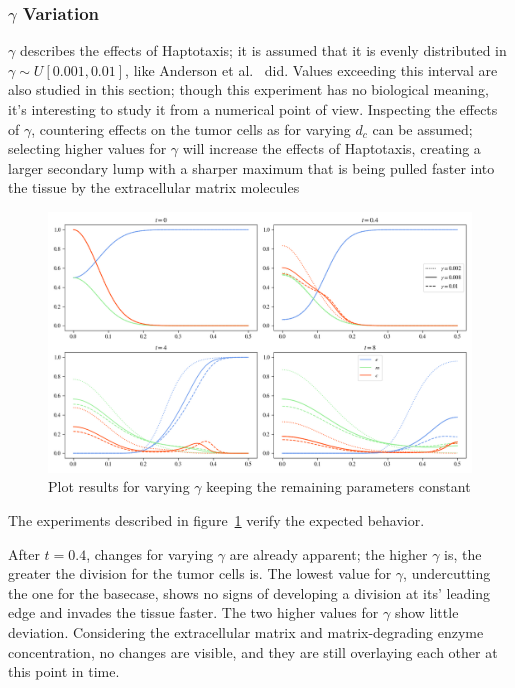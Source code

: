 \subsubsection*{$\gamma$ Variation}
$\gamma$ describes the effects of Haptotaxis; it is assumed that it is evenly distributed in $\gamma \sim U[0.001,0.01]$, like Anderson et al.~\cite{anderson_mathematical_2000} did. Values exceeding this interval are also studied in this section; though this experiment has no biological meaning, it's interesting to study it from a numerical point of view. Inspecting the effects of $\gamma$, countering effects on the tumor cells as for varying $d_c$ can be assumed; selecting higher values for $\gamma$ will increase the effects of Haptotaxis, creating a larger secondary lump with a sharper maximum that is being pulled faster into the tissue by the extracellular matrix molecules
\begin{figure}[h!]
 \centering
 \includegraphics[width=\textwidth]{resources/images/gamma_variation.png}
 \caption{Plot results for varying $\gamma$ keeping the remaining parameters constant}
 \label{fig:gamma_variation}
\end{figure}
The experiments described in figure~\ref{fig:gamma_variation} verify the expected behavior.

After $t=0.4$, changes for varying $\gamma$ are already apparent; the higher $\gamma$ is, the greater the division for the tumor cells is. The lowest value for $\gamma$, undercutting the one for the basecase, shows no signs of developing a division at its' leading edge and invades the tissue faster. The two higher values for $\gamma$ show little deviation. Considering the extracellular matrix and matrix-degrading enzyme concentration, no changes are visible, and they are still overlaying each other at this point in time.

